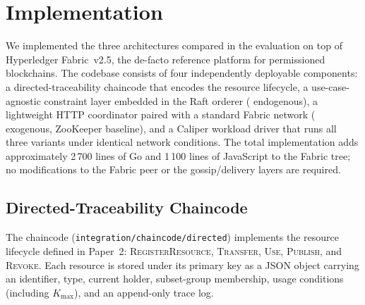 
\section{Implementation}
\label{sec:implementation}

We implemented the three architectures compared in the evaluation on top of
Hyperledger Fabric~v2.5, the de-facto reference platform for permissioned
blockchains.  The codebase consists of four independently deployable
components: a directed-traceability chaincode that encodes the resource
lifecycle, a use-case-agnostic constraint layer embedded in the Raft orderer
( endogenous), a lightweight HTTP coordinator paired with a standard
Fabric network ( exogenous, ZooKeeper baseline), and a Caliper
workload driver that runs all three variants under identical network conditions.
The total implementation adds approximately 2\,700 lines of Go and
1\,100 lines of JavaScript to the Fabric tree; no modifications to the Fabric peer
or the gossip/delivery layers are required.

\subsection{Directed-Traceability Chaincode}
\label{subsec:impl-chaincode}

The chaincode (\texttt{integration/chaincode/directed}) implements the
resource lifecycle defined in Paper~2:
\textsc{RegisterResource}, \textsc{Transfer}, \textsc{Use}, \textsc{Publish},
and \textsc{Revoke}.  Each resource is stored under its primary key as a JSON
object carrying an identifier, type, current holder, subset-group membership,
usage conditions (including $K_\text{max}$), and an append-only trace log.

